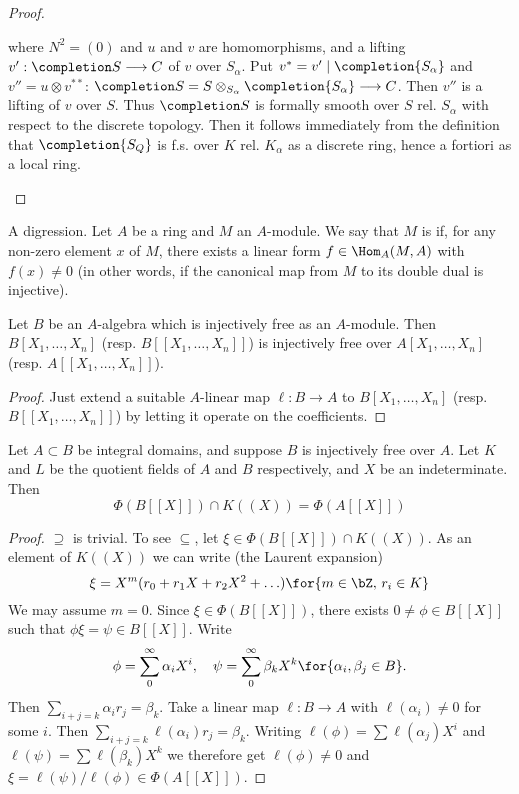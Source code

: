 \documentclass[../main]{subfiles}
\begin{document}
\begin{proof}
\begin{enumerate}[label = Step \Roman*.]
where $N^2 = (0)$ and $u$ and $v$ are homomorphisms, and a lifting $v' : \completion S \longrightarrow C$ of $v$ over $S_\alpha$. Put $v^\ast = v' \mid \completion {S_\alpha}$ and $v'' = u \otimes v^{\ast \ast}$: $\completion S = S \otimes_{S_\alpha} \completion {S_\alpha} \longrightarrow C$. Then $v''$ is a lifting of $v$ over $S$. Thus $\completion S$ is formally smooth over $S$ rel. $S_\alpha$ with respect to the discrete topology. Then it follows immediately from the definition that $\completion {S_Q}$ is f.s. over $K$ rel. $K_\alpha$ as a discrete ring, hence a fortiori as a local ring. 
\end{enumerate}
\end{proof}

\newparagraph A digression. Let $A$ be a ring and $M$ an $A$-module. We say that $M$ is  if, for any non-zero element $x$ of $M$, there exists a linear form $f \in \Hom_A(M, A)$ with $f(x) \ne 0$ (in other words, if the canonical map from $M$ to its double dual is injective). 

\begin{lemma}
Let $B$ be an $A$-algebra which is injectively free as an $A$-module. Then $B[X_1, \ldots, X_n]$ (resp. $B[[X_1, \ldots, X_n]]$) is injectively free over $A[X_1, \ldots, X_n]$ (resp. $A[[X_1, \ldots, X_n]]$).
\end{lemma}

\begin{proof}
Just extend a suitable $A$-linear map $\ell : B \longrightarrow A$ to $B[X_1, \ldots, X_n]$ (resp. $B[[X_1, \ldots, X_n]]$) by letting it operate on the coefficients. 
\end{proof}

\begin{lemma}
Let $A \subset B$ be integral domains, and suppose $B$ is injectively free over $A$. Let $K$ and $L$ be the quotient fields of $A$ and $B$ respectively, and $X$ be an indeterminate. Then
\[
\Phi(B[[X]]) \cap K((X)) = \Phi(A[[X]])
\]
\end{lemma}

\begin{proof}
$\supseteq$ is trivial. To see $\subseteq$, let $\xi \in \Phi(B[[X]]) \cap K((X))$. As an element of $K((X))$ we can write (the Laurent expansion)
\[
\xi = X^m(r_0 + r_1 X + r_2 X^2 + \ldots)\for{ m \in \bZ, \, r_i \in K}
\]
We may assume $m = 0$. Since $\xi \in \Phi(B[[X]])$, there exists $0 \ne \phi \in B[[X]]$ such that $\phi \xi = \psi \in B[[X]]$. Write
\[
\phi = \sum_0^\infty \alpha_i X^i, \quad \psi = \sum_0^\infty \beta_k X^k \for{ \alpha_i, \beta_j \in B}.
\]
Then $\sum_{i + j = k} \alpha_i r_j = \beta_k$. Take a linear map $\ell : B \longrightarrow A$ with $\ell(\alpha_i) \ne 0$ for some $i$. Then $\sum_{i + j = k} \ell(\alpha_i) r_j = \beta_k$. Writing $\ell(\phi) = \sum \ell(\alpha_j) X^i$ and $\ell(\psi) = \sum \ell(\beta_k) X^k$ we therefore get $\ell(\phi) \ne 0$ and $\xi = \ell(\psi)/\ell(\phi) \in \Phi(A[[X]])$. 
\end{proof}
\end{document}
